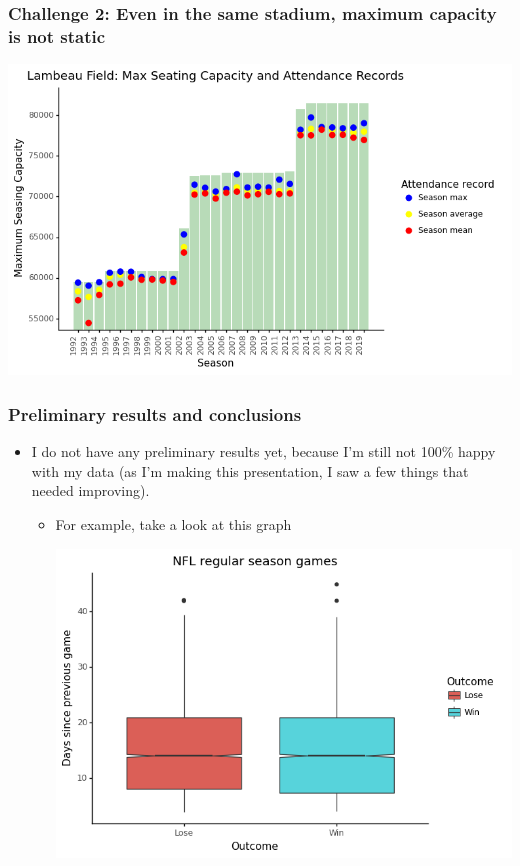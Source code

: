 \documentclass[t]{beamer}
\begin{document}
\begin{frame}
\frametitle{Challenge 2: Even in the same stadium, maximum capacity is not static}

\pause

\centering\includegraphics[width=\linewidth]{../09_figures/plot_lambeau.png}

\end{frame}









\begin{frame}
\frametitle{Preliminary results and conclusions}

\begin{itemize}
\item<1->{I do not have any preliminary results yet, because I'm still not 100\% happy with my data (as I'm making this presentation, I saw a few things that needed improving).}
	\begin{itemize}
	\item<2->{For example, take a look at this graph}
	
\centering\includegraphics[width=\linewidth]{../09_figures/plot_timerest_wrong.png}
	\end{itemize}
\end{itemize}
\end{frame}
\end{document}
